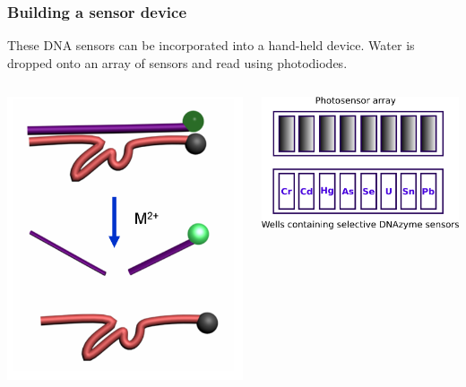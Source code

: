\documentclass[10pt, xcolor=x11names, compress]{beamer}
\begin{document}
\begin{frame}
  \frametitle{Building a sensor device}
  \begin{center}
    These DNA sensors can be incorporated into a hand-held device.
    Water is dropped onto an array of sensors and read using
    photodiodes.

    \bigskip

    \begin{columns}
      \begin{column}{0.5\linewidth}
        \begin{center}
          \includegraphics[width=0.8\linewidth]{images/DNAzyme_cleavage.png}
        \end{center}
      \end{column}
      \begin{column}{0.5\linewidth}
        \includegraphics[width=\linewidth]{images/schematic.png}
      \end{column}
    \end{columns}

  \end{center}
\end{frame}
\end{document}
